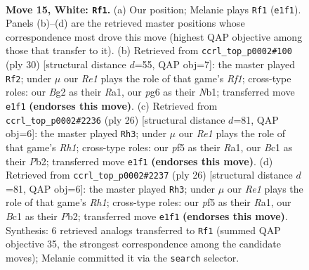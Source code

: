 \documentclass[11pt]{article}
\begin{document}
\clearpage

\begin{figure}[p]\centering
\begin{subfigure}{0.46\textwidth}\centering
\resizebox{\linewidth}{!}{%
\newchessgame
\chessboard[
  setfen={1nb2rk1/r5b1/1p2pnp1/p1p2p1p/2P5/1P4P1/P2NPPBP/R1BNR1K1 w - - 2 15},
  showmover=false,
  pgfstyle=straightmove, color=movearrow, markmove={e1-f1}
]}
\caption{}
\end{subfigure}\hfill
\begin{subfigure}{0.46\textwidth}\centering
\resizebox{\linewidth}{!}{%
\newchessgame
\chessboard[
  setfen={r3kb1r/1bp4p/ppn3p1/4Pp2/3p1P2/3P4/PPP3PP/RNB1NRK1 w kq - 1 16},
  showmover=false,
  pgfstyle=straightmove, color=movearrow, markmove={f1-f2}
]}
\caption{}
\end{subfigure}
\\[4pt]
\begin{subfigure}{0.46\textwidth}\centering
\resizebox{\linewidth}{!}{%
\newchessgame
\chessboard[
  setfen={r3kb1r/pp2npp1/4p2p/3pP2P/1n1P4/8/PP1NNPP1/R1B2K1R w kq - 3 14},
  showmover=false,
  pgfstyle=straightmove, color=movearrow, markmove={h1-h3}
]}
\caption{}
\end{subfigure}\hfill
\begin{subfigure}{0.46\textwidth}\centering
\resizebox{\linewidth}{!}{%
\newchessgame
\chessboard[
  setfen={r3kb1r/pp2npp1/4p2p/3pP2P/1n1P4/8/PP1NNPP1/R1B2K1R w kq - 3 14},
  showmover=false,
  pgfstyle=straightmove, color=movearrow, markmove={h1-h3}
]}
\caption{}
\end{subfigure}
\caption{\textbf{Move 15, White: \texttt{Rf1}.} (a) Our position; Melanie plays \texttt{Rf1} (\texttt{e1f1}). Panels (b)--(d) are the retrieved master positions whose correspondence most drove this move (highest QAP objective among those that transfer to it). (b) Retrieved from \texttt{ccrl\_top\_p0002\#100} (ply 30) [structural distance $d$=55, QAP obj=7]: the master played \texttt{Rf2}; under $\mu$ our \emph{Re1} plays the role of that game's \emph{Rf1}; cross-type roles: our \emph{B}g2 as their \emph{R}a1, our \emph{p}g6 as their \emph{N}b1; transferred move \texttt{e1f1} \textbf{(endorses this move)}. (c) Retrieved from \texttt{ccrl\_top\_p0002\#2236} (ply 26) [structural distance $d$=81, QAP obj=6]: the master played \texttt{Rh3}; under $\mu$ our \emph{Re1} plays the role of that game's \emph{Rh1}; cross-type roles: our \emph{p}f5 as their \emph{R}a1, our \emph{B}c1 as their \emph{P}b2; transferred move \texttt{e1f1} \textbf{(endorses this move)}. (d) Retrieved from \texttt{ccrl\_top\_p0002\#2237} (ply 26) [structural distance $d$=81, QAP obj=6]: the master played \texttt{Rh3}; under $\mu$ our \emph{Re1} plays the role of that game's \emph{Rh1}; cross-type roles: our \emph{p}f5 as their \emph{R}a1, our \emph{B}c1 as their \emph{P}b2; transferred move \texttt{e1f1} \textbf{(endorses this move)}. Synthesis: 6 retrieved analogs transferred to \texttt{Rf1} (summed QAP objective 35, the strongest correspondence among the candidate moves); Melanie committed it via the \texttt{search} selector.}
\label{fig:thought-m28}
\end{figure}
\end{document}

